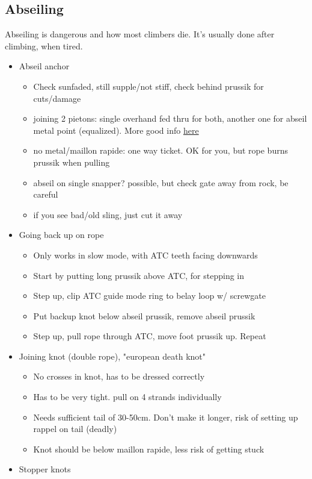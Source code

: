 \subsection{Abseiling}
Abseiling is dangerous and how most climbers die. It's usually done after climbing, when tired.
\begin{itemize}
\item Abseil anchor
	\begin{itemize}
	\item Check sunfaded, still supple/not stiff, check behind prussik for cuts/damage
	\item joining 2 pietons: single overhand fed thru for both, another one for abseil metal point (equalized). More good info \href{https://www.alpinesavvy.com/blog/retreat-anchors-alpine-climbing}{here}
	\item no metal/maillon rapide: one way ticket. OK for you, but rope burns prussik when pulling
	\item abseil on single snapper? possible, but check gate away from rock, be careful
	\item if you see bad/old sling, just cut it away
	\end{itemize}
\item Going back up on rope
	\begin{itemize}
	\item Only works in slow mode, with ATC teeth facing downwards
	\item Start by putting long prussik above ATC, for stepping in
	\item Step up, clip ATC guide mode ring to belay loop w/ screwgate
	\item Put backup knot below abseil prussik, remove abseil prussik
	\item Step up, pull rope through ATC, move foot prussik up. Repeat
	\end{itemize}
\item Joining knot (double rope), "european death knot"
	\begin{itemize}
	\item No crosses in knot, has to be dressed correctly
	\item Has to be very tight. pull on 4 strands individually
	\item Needs sufficient tail of 30-50cm. Don't make it longer, risk of setting up rappel on tail (deadly)
	\item Knot should be below maillon rapide, less risk of getting stuck
	\end{itemize}
\item Stopper knots

\end{itemize}
